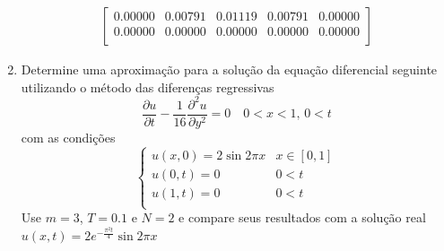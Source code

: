 \documentclass[a4paper, 11pt]{report}
\begin{document}
\begin{enumerate}[leftmargin=*]
\begin{minipage}{0.6\columnwidth}
\begin{align*}
\begin{bmatrix}
                    0.00000 &  0.00791 &  0.01119 &  0.00791 &  0.00000\\  
                    0.00000 &  0.00000 &  0.00000 &  0.00000 &  0.00000\\ 
                \end{bmatrix}
            \end{align*}
        \end{minipage}
        \item Determine uma aproximação para a solução da equação diferencial seguinte utilizando o método das diferenças regressivas
        \[
        \dfrac{\partial u}{\partial t} - \frac{1}{16}\dfrac{\partial^2 u}{\partial y^2} = 0 \quad 0 < x < 1, \, 0 < t
        \]
        com as condições
        \[
            \left\{  
                \begin{array}{ll}
                    u(x,0) = 2\sin 2\pi x & x \in [0,1]\\  
                    u(0,t) = 0 & 0 < t\\
                    u(1,t) = 0 & 0 < t\\
                \end{array}
            \right.
        \]
        Use $m = 3$, $T = 0.1$ e $N = 2$ e compare seus resultados com a solução real $u(x,t) = 2e^{-\frac{\pi^2t}{4}}\sin 2 \pi x$
        

\end{enumerate}
\end{document}
